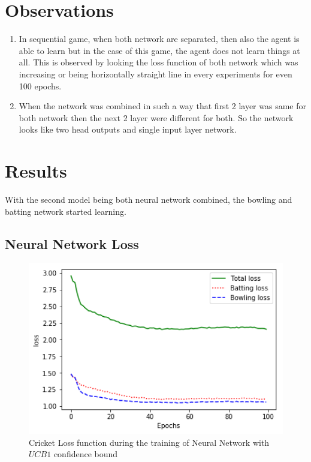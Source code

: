 \section{Observations}
\begin{enumerate}
    \item In sequential game, when both network are separated, then also the agent is able to learn but in the case of this game, the agent does not learn things at all. This is observed by looking the loss function of both network which was increasing or being horizontally straight line in every experiments for even 100 epochs.
    \item When the network was combined in such a way that first 2 layer was same for both network then the next 2 layer were different for both. So the network looks like two head outputs and single input layer network.
    
\end{enumerate}

\section{Results}
With the second model being both neural network combined, the bowling and batting network started learning. 
\subsection{Neural Network Loss}
\begin{figure}
 	[!htb]\centering
    \includegraphics[width=6in]{images/ucb_cricket.png}
    \caption{Cricket Loss function during the training of Neural Network with $UCB1$ confidence bound}
  \label{fig:phase}
  \end{figure}
 
